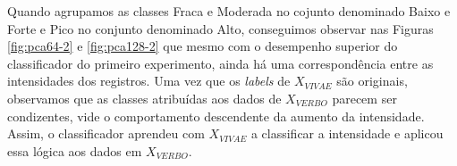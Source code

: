 Quando agrupamos as classes Fraca e Moderada no cojunto denominado Baixo e Forte e Pico no conjunto denominado Alto, conseguimos observar nas Figuras \ref{fig:pca64-2} e \ref{fig:pca128-2} que mesmo com o desempenho superior do classificador do primeiro experimento, ainda há uma correspondência entre as intensidades dos registros. Uma vez que os \textit{labels} de $X_{VIVAE}$ são originais, observamos que as classes atribuídas aos dados de $X_{VERBO}$ parecem ser condizentes, vide o comportamento descendente da aumento da intensidade. Assim, o classificador aprendeu com $X_{VIVAE}$ a classificar a intensidade e aplicou essa lógica aos dados em $X_{VERBO}$.
